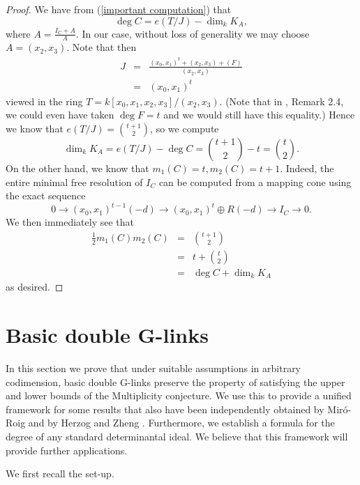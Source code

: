 \documentclass[12pt,twoside]{amsart}
\numberwithin{equation}{section}
\theoremstyle{definition}
\begin{document}
\begin{proof}
We have from (\ref{important computation}) that
\[
\deg C = e( T/J) - \dim_k K_A,
\]
where $A = \frac{I_C + A}{A}$.  In our case, without loss of generality we may
choose $A = (x_2,x_3)$.  Note that then
\[
\begin{array}{rcl}
J & = & \displaystyle \frac{(x_0,x_1)^t + (x_2,x_3) + (F)}{(x_2,x_3)}  \\
& = & (x_0,x_1)^t
\end{array}
\]
viewed in the ring $T = k[x_0,x_1,x_2,x_3]/(x_2,x_3)$.  (Note that in \cite{MNR},
Remark 2.4, we could even have taken $\deg F = t$ and we would still have this
equality.)  Hence we know that $e(T/ J) =
\binom{t+1}{2}$, so we compute
\[
\dim_k K_A = e(T/ J) - \deg C = \binom{t+1}{2} - t = \binom{t}{2}.
\]
On the other hand, we know that $m_1(C) = t, m_2(C) = t+1$.  Indeed, the entire
minimal free resolution of $I_C$ can be computed from a mapping cone using the
exact sequence
\[
0 \rightarrow (x_0,x_1)^{t-1}(-d) \rightarrow (x_0,x_1)^t \oplus R(-d)
\rightarrow I_C \rightarrow 0.
\]
We then immediately see that
\[
\begin{array}{rcl}
\displaystyle \frac{1}{2} m_1(C) m_2(C) & = & \displaystyle \binom{t+1}{2}
\\ & = & \displaystyle t + \binom{t}{2} \\
& = & \deg C + \dim_k K_A
\end{array}
\]
as desired.
\end{proof}




\section{Basic double G-links} \label{sec-bdl}

In this section we prove that under suitable assumptions in arbitrary codimension,  basic
double G-links preserve the property of satisfying the upper and lower bounds of the
Multiplicity conjecture. We use this to provide a unified framework for some results that
also have been independently obtained by Mir\'o-Roig \cite{rosapaper} and by Herzog and
Zheng \cite{H}. Furthermore, we establish a formula for the degree of any standard
determinantal ideal. We believe that this framework will provide further applications.

 We first recall the set-up.
\end{document}
